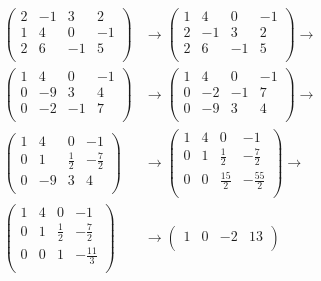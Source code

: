 \documentclass[letterpaper]{article}
\theoremstyle{definition}
\theoremstyle{lemathm}
\theoremstyle{lemademthm}
\begin{document}
\begin{enumerate}
		\begin{align*}
			\begin{pmatrix}
				2 & -1 & 3 & 2\\
				1 & 4 & 0 & -1\\
				2 & 6 & -1 & 5\\
			\end{pmatrix}
			&\rightarrow
			\begin{pmatrix}
				1 & 4 & 0 & -1\\
				2 & -1 & 3 & 2\\
				2 & 6 & -1 & 5\\
			\end{pmatrix}
			\rightarrow\\
			\begin{pmatrix}
				1 & 4 & 0 & -1\\
				0 & -9 & 3 & 4\\
				0 & -2 & -1 & 7\\
			\end{pmatrix}
			&\rightarrow
			\begin{pmatrix}
				1 & 4 & 0 & -1\\
				0 & -2 & -1 & 7\\
				0 & -9 & 3 & 4\\
			\end{pmatrix}
			\rightarrow\\
			\begin{pmatrix}
				1 & 4 & 0 & -1\\
				0 & 1 & \frac{1}{2} & -\frac{7}{2}\\
				0 & -9 & 3 & 4\\
			\end{pmatrix}
			&\rightarrow
			\begin{pmatrix}
				1 & 4 & 0 & -1\\
				0 & 1 & \frac{1}{2} & -\frac{7}{2}\\
				0 & 0 & \frac{15}{2} & -\frac{55}{2}\\
			\end{pmatrix}
			\rightarrow\\
			\begin{pmatrix}
				1 & 4 & 0 & -1\\
				0 & 1 & \frac{1}{2} & -\frac{7}{2}\\
				0 & 0 & 1 & -\frac{11}{3}\\
			\end{pmatrix}
			&\rightarrow
			\begin{pmatrix}
				1 & 0 & -2 & 13\\

\end{pmatrix}
\end{align*}
\end{enumerate}
\end{document}
